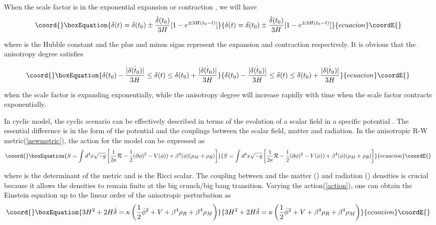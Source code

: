 \documentclass[a4paper,preprint]{revtex4}
\begin{document}
\noindent When the scale factor is in the exponential expansion or
contraction \coordHE{}, we will have
\begin{equation}\coord{}\boxEquation{\label{exp}
\delta(t)=\delta(t_0)\pm\frac{\dot{\delta}(t_0)}{3H}[1-e^{\pm3H(t_0-t)}]
}{\delta(t)=\delta(t_0)\pm\frac{\dot{\delta}(t_0)}{3H}[1-e^{\pm3H(t_0-t)}]
}{ecuacion}\coordE{}\end{equation}

\noindent where \coordHE{} is the Hubble constant and the plus and minus
signs represent the expansion and contraction respectively. It is
obvious that the anisotropy degree \coordHE{} satisfies

\begin{equation}\coord{}\boxEquation{\label{condition1}
\delta(t_0)-\frac{|\dot{\delta(t_0)}|}{3H}\leq \delta(t)\leq
\delta(t_0)+\frac{|\dot{\delta(t_0)}|}{3H}
}{\delta(t_0)-\frac{|\dot{\delta(t_0)}|}{3H}\leq \delta(t)\leq
\delta(t_0)+\frac{|\dot{\delta(t_0)}|}{3H}
}{ecuacion}\coordE{}\end{equation}

\noindent when the scale factor is expanding exponentially, while
the anisotropy degree will increase rapidly with time when the
scale factor contracts exponentially.

In cyclic model, the cyclic scenario can be effectively described
in terms of the evolution of a scalar field in a specific
potential \coordHE{}. The essential difference is in the form of
the potential and the couplings between the scalar field, matter
and radiation\cite{steinhardt1}. In the anisotropic R-W
metric(\ref{newmetric}), the action for the model can be expressed
as
\begin{equation}\coord{}\boxEquation{\label{action}
S=\int d^4x\sqrt{-g}\left[\frac{1}{2\kappa}{\cal
R}-\frac{1}{2}(\partial\phi)^2-
V(\phi))+\beta^4(\phi)(\rho_M+\rho_R)\right]
}{S=\int d^4x\sqrt{-g}\left[\frac{1}{2\kappa}{\cal
R}-\frac{1}{2}(\partial\phi)^2-
V(\phi))+\beta^4(\phi)(\rho_M+\rho_R)\right]
}{ecuacion}\coordE{}\end{equation}

\noindent where \coordHE{} is the determinant of the metric \coordHE{}
and \coordHE{} is the Ricci scalar. The coupling \myHighlight{$\beta(\phi)$}\coordHE{}
between \myHighlight{$\phi$}\coordHE{} and the matter (\coordHE{}) and radiation (\coordHE{})
densities is crucial because it allows the densities to remain
finite at the big crunch/big bang transition. Varying the
action(\ref{action}), one can obtain the Einstein equation up to
the linear order of the anisotropic perturbation as
\begin{equation}\coord{}\boxEquation{\label{einstein11}
3H^2+2H\dot{\delta}=\kappa \left( \frac{1}{2} \dot{\phi}^2 +V +
\beta^4 \rho_R + \beta^4 \rho_M \right)
}{3H^2+2H\dot{\delta}=\kappa \left( \frac{1}{2} \dot{\phi}^2 +V +
\beta^4 \rho_R + \beta^4 \rho_M \right)
}{ecuacion}\coordE{}\end{equation}
\end{document}
